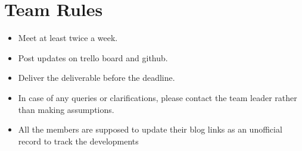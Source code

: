 \documentclass{article}
\begin{document}
\section{Team Rules}
\begin{itemize}
    \item Meet at least twice a week.
    \item Post updates on trello board and github.
    \item Deliver the deliverable before the deadline.
    \item In case of any queries or clarifications, please contact the team leader rather than making assumptions.
    \item All the members are supposed to update their blog links as an unofficial record to track the developments
\end{itemize}
\end{document}
